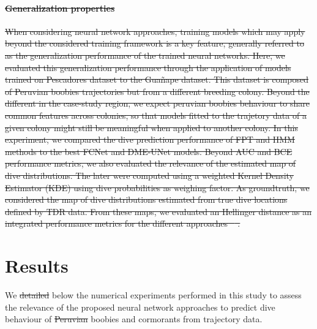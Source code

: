 \documentclass{article}
\providecommand{\DIFaddtex}[1]{{\protect\color{blue}\uwave{#1}}} %
\providecommand{\DIFdeltex}[1]{{\protect\color{red}\sout{#1}}}                      %
\providecommand{\DIFaddbegin}{} %
\providecommand{\DIFaddend}{} %
\providecommand{\DIFdelbegin}{} %
\providecommand{\DIFdelend}{} %
\providecommand{\DIFadd}[1]{\texorpdfstring{\DIFaddtex{#1}}{#1}} %
\providecommand{\DIFdel}[1]{\texorpdfstring{\DIFdeltex{#1}}{}} %
\newcommand{\DIFscaledelfig}{0.5}
\newlength{\DIFdelgraphicswidth} %
\newlength{\DIFdelgraphicsheight} %
\newcommand{\DIFaddincludegraphics}[2][]{{\color{blue}\fbox{\DIFOincludegraphics[#1]{#2}}}} %
\newcommand{\DIFdelincludegraphics}[2][]{%
\sbox{\DIFdelgraphicsbox}{\DIFOincludegraphics[#1]{#2}}%
\settoboxwidth{\DIFdelgraphicswidth}{\DIFdelgraphicsbox} %
\settoboxtotalheight{\DIFdelgraphicsheight}{\DIFdelgraphicsbox} %
\scalebox{\DIFscaledelfig}{%
\parbox[b]{\DIFdelgraphicswidth}{\usebox{\DIFdelgraphicsbox}\\[-\baselineskip] \rule{\DIFdelgraphicswidth}{0em}}\llap{\resizebox{\DIFdelgraphicswidth}{\DIFdelgraphicsheight}{%
\setlength{\unitlength}{\DIFdelgraphicswidth}%
\begin{picture}(1,1)%
\thicklines\linethickness{2pt} %
{\color[rgb]{1,0,0}\put(0,0){\framebox(1,1){}}}%
{\color[rgb]{1,0,0}\put(0,0){\line( 1,1){1}}}%
{\color[rgb]{1,0,0}\put(0,1){\line(1,-1){1}}}%
\end{picture}%
}\hspace*{3pt}}} %
} %
\DeclareRobustCommand{\DIFaddbegin}{\DIFOaddbegin \let\includegraphics\DIFaddincludegraphics} %
\DeclareRobustCommand{\DIFaddend}{\DIFOaddend \let\includegraphics\DIFOincludegraphics} %
\DeclareRobustCommand{\DIFdelbegin}{\DIFOdelbegin \let\includegraphics\DIFdelincludegraphics} %
\DeclareRobustCommand{\DIFdelend}{\DIFOaddend \let\includegraphics\DIFOincludegraphics} %
\begin{document}
\DIFdelbegin \paragraph{\DIFdel{Generalization properties}}
\addtocounter{paragraph}{-1}%
\DIFdel{When considering neural network approaches, training models which may apply beyond the considered training framework is a key feature, generally referred to as the generalization performance of the trained neural networks. Here, we evaluated this generalization performance through the application of models trained on Pescadores dataset to the Gua\~nape dataset.
This dataset is composed of Peruvian boobies trajectories but from a different breeding colony. Beyond the different in the case-study region, we expect peruvian boobies behaviour to share common features across colonies, so that models fitted to the trajetory data of a given colony might still be meaningful when applied to another colony.
In this experiment, we compared the dive prediction performance of FPT and HMM methods to the best FCNet and DME-UNet models. Beyond AUC and BCE performance metrics, we also evaluated the relevance of the estimated map of dive distributions. The later were computed using a weighted Kernel Density Estimator (KDE) using dive probabilities as weighing factor. As groundtruth, we considered the map of dive distributions estimated from true dive locations defined by TDR data. From these maps, we evaluated an Hellinger distance as an integrated performance metrics for the different approaches \mbox{%
\cite{wilson_distancebased_2011}}\hspace{0pt}%
.
}%

\DIFdelend \section{Results}

We \DIFdelbegin \DIFdel{detailed }\DIFdelend \DIFaddbegin \DIFadd{detail }\DIFaddend below the numerical experiments performed in this study to assess the relevance of the proposed neural network approaches to predict dive behaviour of \DIFdelbegin \DIFdel{Peruvian }\DIFdelend boobies and cormorants from trajectory data.
\end{document}
